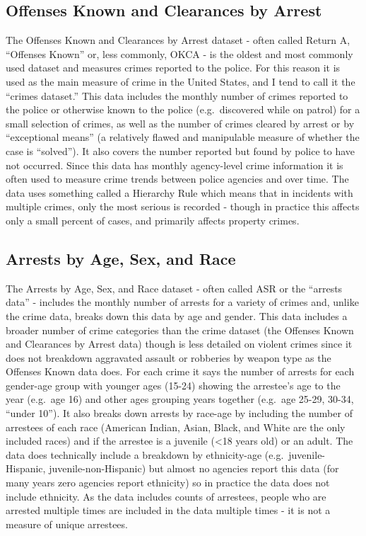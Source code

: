 \documentclass[
  12pt,
  openany]{book}
\begin{document}
\hypertarget{offenses-known-and-clearances-by-arrest}{%
\subsection{Offenses Known and Clearances by Arrest}\label{offenses-known-and-clearances-by-arrest}}

The Offenses Known and Clearances by Arrest dataset - often called Return A, ``Offenses Known'' or, less commonly, OKCA - is the oldest and most commonly used dataset and measures crimes reported to the police. For this reason it is used as the main measure of crime in the United States, and I tend to call it the ``crimes dataset.'' This data includes the monthly number of crimes reported to the police or otherwise known to the police (e.g.~discovered while on patrol) for a small selection of crimes, as well as the number of crimes cleared by arrest or by ``exceptional means'' (a relatively flawed and manipulable measure of whether the case is ``solved''). It also covers the number reported but found by police to have not occurred. Since this data has monthly agency-level crime information it is often used to measure crime trends between police agencies and over time. The data uses something called a Hierarchy Rule which means that in incidents with multiple crimes, only the most serious is recorded - though in practice this affects only a small percent of cases, and primarily affects property crimes.

\hypertarget{arrests-by-age-sex-and-race}{%
\subsection{Arrests by Age, Sex, and Race}\label{arrests-by-age-sex-and-race}}

The Arrests by Age, Sex, and Race dataset - often called ASR or the ``arrests data'' - includes the monthly number of arrests for a variety of crimes and, unlike the crime data, breaks down this data by age and gender. This data includes a broader number of crime categories than the crime dataset (the Offenses Known and Clearances by Arrest data) though is less detailed on violent crimes since it does not breakdown aggravated assault or robberies by weapon type as the Offenses Known data does. For each crime it says the number of arrests for each gender-age group with younger ages (15-24) showing the arrestee's age to the year (e.g.~age 16) and other ages grouping years together (e.g.~age 25-29, 30-34, ``under 10''). It also breaks down arrests by race-age by including the number of arrestees of each race (American Indian, Asian, Black, and White are the only included races) and if the arrestee is a juvenile (\textless18 years old) or an adult. The data does technically include a breakdown by ethnicity-age (e.g.~juvenile-Hispanic, juvenile-non-Hispanic) but almost no agencies report this data (for many years zero agencies report ethnicity) so in practice the data does not include ethnicity. As the data includes counts of arrestees, people who are arrested multiple times are included in the data multiple times - it is not a measure of unique arrestees.
\end{document}
